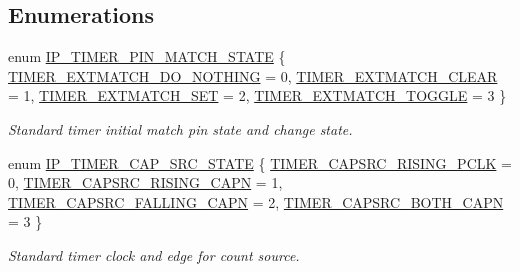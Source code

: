 \subsection*{Enumerations}
\begin{DoxyCompactItemize}
\item 
enum \hyperlink{group__TIMER__17XX__40XX_ga29caa12f43ff996d3ebbf7d5f9036f2c}{I\-P\-\_\-\-T\-I\-M\-E\-R\-\_\-\-P\-I\-N\-\_\-\-M\-A\-T\-C\-H\-\_\-\-S\-T\-A\-T\-E} \{ \hyperlink{group__TIMER__17XX__40XX_gga29caa12f43ff996d3ebbf7d5f9036f2caee61101edb52ea5ce70b74a41766467f}{T\-I\-M\-E\-R\-\_\-\-E\-X\-T\-M\-A\-T\-C\-H\-\_\-\-D\-O\-\_\-\-N\-O\-T\-H\-I\-N\-G} = 0, 
\hyperlink{group__TIMER__17XX__40XX_gga29caa12f43ff996d3ebbf7d5f9036f2ca0fc4886f55eb7bcfda4baea4c08c551a}{T\-I\-M\-E\-R\-\_\-\-E\-X\-T\-M\-A\-T\-C\-H\-\_\-\-C\-L\-E\-A\-R} = 1, 
\hyperlink{group__TIMER__17XX__40XX_gga29caa12f43ff996d3ebbf7d5f9036f2ca059e5dedfdab474ecafba9827116f5ff}{T\-I\-M\-E\-R\-\_\-\-E\-X\-T\-M\-A\-T\-C\-H\-\_\-\-S\-E\-T} = 2, 
\hyperlink{group__TIMER__17XX__40XX_gga29caa12f43ff996d3ebbf7d5f9036f2caa7b4fdd349721213351a4bba29472215}{T\-I\-M\-E\-R\-\_\-\-E\-X\-T\-M\-A\-T\-C\-H\-\_\-\-T\-O\-G\-G\-L\-E} = 3
 \}
\begin{DoxyCompactList}\small\item\em Standard timer initial match pin state and change state. \end{DoxyCompactList}\item 
enum \hyperlink{group__TIMER__17XX__40XX_ga1ceafbd6fb46418e292878934efb63aa}{I\-P\-\_\-\-T\-I\-M\-E\-R\-\_\-\-C\-A\-P\-\_\-\-S\-R\-C\-\_\-\-S\-T\-A\-T\-E} \{ \hyperlink{group__TIMER__17XX__40XX_gga1ceafbd6fb46418e292878934efb63aaa9c110041557616b65aff5c20d03ae8be}{T\-I\-M\-E\-R\-\_\-\-C\-A\-P\-S\-R\-C\-\_\-\-R\-I\-S\-I\-N\-G\-\_\-\-P\-C\-L\-K} = 0, 
\hyperlink{group__TIMER__17XX__40XX_gga1ceafbd6fb46418e292878934efb63aaae17c344c6e80cc8f2a0e6f5c4bc32269}{T\-I\-M\-E\-R\-\_\-\-C\-A\-P\-S\-R\-C\-\_\-\-R\-I\-S\-I\-N\-G\-\_\-\-C\-A\-P\-N} = 1, 
\hyperlink{group__TIMER__17XX__40XX_gga1ceafbd6fb46418e292878934efb63aaaf07e78a49ce7829f3a7975196aeb5a5c}{T\-I\-M\-E\-R\-\_\-\-C\-A\-P\-S\-R\-C\-\_\-\-F\-A\-L\-L\-I\-N\-G\-\_\-\-C\-A\-P\-N} = 2, 
\hyperlink{group__TIMER__17XX__40XX_gga1ceafbd6fb46418e292878934efb63aaaa09ba96751f9c750f9257050053ccb62}{T\-I\-M\-E\-R\-\_\-\-C\-A\-P\-S\-R\-C\-\_\-\-B\-O\-T\-H\-\_\-\-C\-A\-P\-N} = 3
 \}
\begin{DoxyCompactList}\small\item\em Standard timer clock and edge for count source. \end{DoxyCompactList}\end{DoxyCompactItemize}
